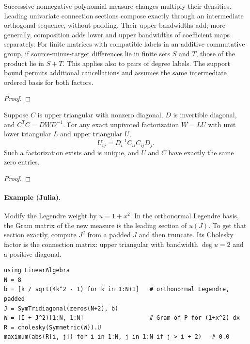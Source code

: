 \begin{theorem}
\label{thm:conversion-composition-support}
\leanok
Successive nonnegative polynomial measure changes multiply their densities.
Leading univariate connection sections compose exactly through an intermediate
orthogonal sequence, without padding. Their upper bandwidths add; more generally,
composition adds lower and upper bandwidths of coefficient maps separately.
For finite matrices with compatible labels in an additive commutative group,
if source-minus-target differences lie in finite sets $S$ and $T$, those of
the product lie in $S+T$. This applies also to pairs of degree labels.
The support bound permits additional cancellations and assumes the same
intermediate ordered basis for both factors.
\end{theorem}
\begin{proof}
\leanok
\end{proof}

\begin{theorem}
\label{thm:cholesky-lu}
\leanok
Suppose $C$ is upper triangular with nonzero diagonal, $D$ is invertible diagonal,
and $C^TC=DWD^{-1}$. For any exact unpivoted factorization $W=LU$ with unit lower
triangular $L$ and upper triangular $U$,
\[
 U_{ij}=D_i^{-1}C_{ii}C_{ij}D_j.
\]
Such a factorization exists and is unique, and $U$ and $C$ have exactly the same
zero entries.
\end{theorem}
\begin{proof}
\leanok
\end{proof}


\paragraph{Example (Julia).} Modify the Legendre weight by $u=1+x^2$. In the
orthonormal Legendre basis, the Gram matrix of the new measure is the leading
section of $u(J)$. To get that section exactly, compute $J^2$ from a padded $J$
and then truncate. Its Cholesky factor is the connection matrix: upper
triangular with bandwidth $\deg u=2$ and a positive diagonal.
\begin{verbatim}
using LinearAlgebra
N = 8
b = [k / sqrt(4k^2 - 1) for k in 1:N+1]   # orthonormal Legendre, padded
J = SymTridiagonal(zeros(N+2), b)
W = (I + J^2)[1:N, 1:N]                   # Gram of P for (1+x^2) dx
R = cholesky(Symmetric(W)).U
maximum(abs(R[i, j]) for i in 1:N, j in 1:N if j > i + 2)   # 0.0
\end{verbatim}

